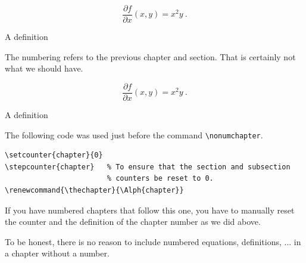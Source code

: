
\begin{equation}
  \frac{\partial f}{\partial x} (x,y) = x^2 y \ .
\end{equation}

\begin{defn}
  A definition
\end{defn}

The numbering refers to the previous chapter and section.    That is
certainly not what we should have.

\clearpage

\setcounter{chapter}{0}
\renewcommand{\thechapter}{\Alph{chapter}}


\begin{equation}
  \frac{\partial f}{\partial x} (x,y) = x^2 y \ .
\end{equation}

\begin{defn}
  A definition
\end{defn}

The following code was used just before the command \verb=\nonumchapter=.

\begin{verbatim}
\setcounter{chapter}{0}
\stepcounter{chapter}   % To ensure that the section and subsection
                        % counters be reset to 0.
\renewcommand{\thechapter}{\Alph{chapter}}
\end{verbatim}

If you have numbered chapters that follow this one, you have to
manually reset the counter and the definition of the chapter number as
we did above.

To be honest, there is no reason to include numbered equations,
definitions, ... in a chapter without a number.


